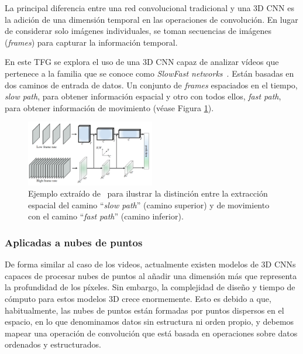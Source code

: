La principal diferencia entre una red convolucional tradicional y una 3D CNN es 
la adición de una dimensión temporal en las operaciones de convolución. 
En lugar de considerar solo imágenes individuales, se toman secuencias de imágenes 
(\emph{frames}) para capturar la información temporal.

En este TFG se explora el uso de una 3D CNN capaz de analizar vídeos que pertenece 
a la familia que se conoce como \emph{SlowFast networks}~\cite{SlowFastNetworks}. Están basadas en dos caminos 
de entrada de datos. Un conjunto de \emph{frames} espaciados en el tiempo, 
\emph{slow path}, para obtener información espacial y otro con todos ellos, \emph{fast path}, 
para obtener información de movimiento (véase Figura \ref{fig:SlowFastPathways}). 

\begin{figure}[htp]
  \begin{center}
    \includegraphics[width=0.5\textwidth]{imagenes/chapter2/SlowFastPathways.png}
  \end{center}
  \caption[Red convolucional espaciotemporal \emph{SlowFast}.]{Ejemplo extraído de~\cite{SlowFastNetworks} para ilustrar la distinción 
  entre la extracción espacial del camino ``\emph{slow path}'' (camino superior) y 
  de movimiento con el camino ``\emph{fast path}'' (camino inferior).}
  \label{fig:SlowFastPathways}
\end{figure}

\subsubsection{Aplicadas a nubes de puntos}

De forma similar al caso de los videos, actualmente existen modelos de 3D CNNs 
capaces de procesar nubes de puntos al añadir una dimensión más que representa 
la profundidad de los píxeles.  Sin embargo, la complejidad de diseño y tiempo de cómputo para 
estos modelos 3D crece enormemente. Esto es debido a que, habitualmente, las nubes de puntos 
están formadas por puntos dispersos en el espacio, en lo que denominamos datos 
sin estructura ni orden propio, y debemos mapear una operación 
de convolución que está basada en operaciones sobre datos ordenados y estructurados. 

